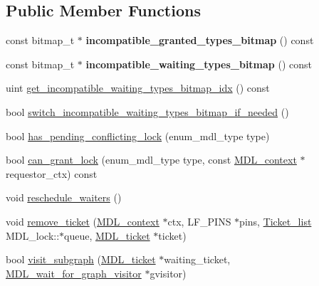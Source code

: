 \subsection*{Public Member Functions}
\begin{DoxyCompactItemize}
\item 
\mbox{\label{classMDL__lock_acc63c21b6c75b3087cd273bc5125e9d0}} 
const bitmap\+\_\+t $\ast$ {\bfseries incompatible\+\_\+granted\+\_\+types\+\_\+bitmap} () const
\item 
\mbox{\label{classMDL__lock_aa90ab350d28e755dcfa69d90004de7aa}} 
const bitmap\+\_\+t $\ast$ {\bfseries incompatible\+\_\+waiting\+\_\+types\+\_\+bitmap} () const
\item 
uint \mbox{\hyperlink{classMDL__lock_afbbc9d77579dd73637b2cc95b7fc249f}{get\+\_\+incompatible\+\_\+waiting\+\_\+types\+\_\+bitmap\+\_\+idx}} () const
\item 
bool \mbox{\hyperlink{classMDL__lock_ab2be5e68445003d7a516849f2bceb18c}{switch\+\_\+incompatible\+\_\+waiting\+\_\+types\+\_\+bitmap\+\_\+if\+\_\+needed}} ()
\item 
bool \mbox{\hyperlink{classMDL__lock_a7707e02d9695b5694336787a622b0060}{has\+\_\+pending\+\_\+conflicting\+\_\+lock}} (enum\+\_\+mdl\+\_\+type type)
\item 
bool \mbox{\hyperlink{classMDL__lock_a8d8e8e3b98525a6c8de14a745dd3ce8f}{can\+\_\+grant\+\_\+lock}} (enum\+\_\+mdl\+\_\+type type, const \mbox{\hyperlink{classMDL__context}{M\+D\+L\+\_\+context}} $\ast$requestor\+\_\+ctx) const
\item 
void \mbox{\hyperlink{classMDL__lock_a07003cc6619a99b6cc36f564c62e4e94}{reschedule\+\_\+waiters}} ()
\item 
void \mbox{\hyperlink{classMDL__lock_a7100ea62bb9af3e959d8a81ba11d4bcb}{remove\+\_\+ticket}} (\mbox{\hyperlink{classMDL__context}{M\+D\+L\+\_\+context}} $\ast$ctx, L\+F\+\_\+\+P\+I\+NS $\ast$pins, \mbox{\hyperlink{classMDL__lock_1_1Ticket__list}{Ticket\+\_\+list}} M\+D\+L\+\_\+lock\+::$\ast$queue, \mbox{\hyperlink{classMDL__ticket}{M\+D\+L\+\_\+ticket}} $\ast$ticket)
\item 
bool \mbox{\hyperlink{classMDL__lock_a56e5025d3f3cff97923bc283c715566d}{visit\+\_\+subgraph}} (\mbox{\hyperlink{classMDL__ticket}{M\+D\+L\+\_\+ticket}} $\ast$waiting\+\_\+ticket, \mbox{\hyperlink{classMDL__wait__for__graph__visitor}{M\+D\+L\+\_\+wait\+\_\+for\+\_\+graph\+\_\+visitor}} $\ast$gvisitor)
\item 

\end{DoxyCompactItemize}
